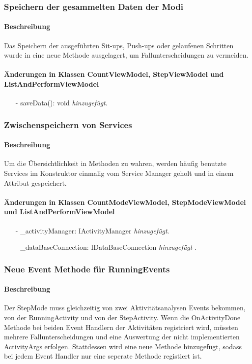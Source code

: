 \documentclass[a4paper,12pt]{article}
\begin{document}
\subsubsection{Speichern der gesammelten Daten der Modi}
\paragraph{Beschreibung}
Das Speichern der ausgeführten Sit-ups, Push-ups oder gelaufenen Schritten wurde in eine neue Methode ausgelagert, um Fallunterscheidungen zu vermeiden.
\paragraph{Änderungen in Klassen CountViewModel, StepViewModel und ListAndPerformViewModel} 
\begin{itemize}
	\item[-] saveData(): void \textit{hinzugefügt}.
\end{itemize}

\subsubsection{Zwischenspeichern von Services}
\paragraph{Beschreibung}
Um die Übersichtlichkeit in Methoden zu wahren, werden häufig benutzte Services im Konstruktor einmalig vom Service Manager geholt und in einem Attribut gespeichert.
\paragraph{Änderungen in Klassen CountModeViewModel, StepModeViewModel und ListAndPerformViewModel} 
\begin{itemize}
	\item[-] \_activityManager: IActivityManager \textit{hinzugefügt}.
	\item[-] \_dataBaseConnection: IDataBaseConnection \textit{hinzugefügt} .
\end{itemize}

\subsubsection{Neue Event Methode für RunningEvents}
\paragraph{Beschreibung}
Der StepMode muss gleichzeitig von zwei Aktivitätsanalysen Events bekommen, von der RunningActivity und von der StepActivity. Wenn die OnActivityDone Methode bei beiden Event Handlern der Aktivitäten registriert wird, müssten mehrere Fallunterscheidungen und eine Auswertung der nicht implementierten ActivityArgs erfolgen. Stattdessen wird eine neue Methode hinzugefügt, sodass bei jedem Event Handler nur eine seperate Methode registiert ist.
\end{document}
